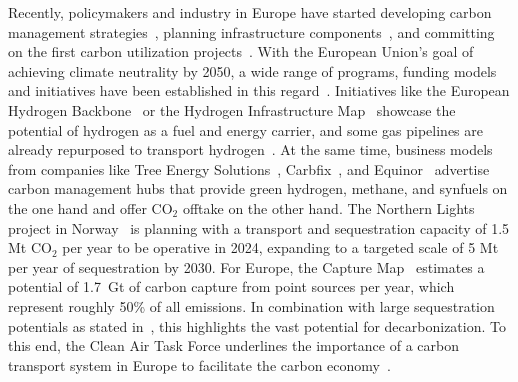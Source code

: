 \documentclass[twocolumn]{article}
\newcommand{\COtwo}{CO$_2$}
\begin{document}
Recently, policymakers and industry in Europe have started developing carbon management strategies~\cite{GermanyDevelopingStrategy2023,CarbonManagementStrategie}, planning infrastructure components~\cite{CONetz}, and committing on the first carbon utilization projects~\cite{EFuelsPilotPlant2022,OrstedAssumesFull,GROUNDBREAKINGEFUELPRODUCTION,DLREfuelsDLR}. With the European Union's goal of achieving climate neutrality by 2050, a wide range of programs, funding models and initiatives have been established in this regard~\cite{eu2023netzero,europeangreendeal,europeaninnovationfund}. Initiatives like the European Hydrogen Backbone~\cite{gasforclimateEuropeanHydrogenBackbone2022} or the Hydrogen Infrastructure Map~\cite{H2InfrastructureMap} showcase the potential of hydrogen as a fuel and energy carrier, and some gas pipelines are already repurposed to transport hydrogen~\cite{RohrFreiFuer}. At the same time, business models from companies like Tree Energy Solutions~\cite{TESHydrogenLife2023}, Carbfix~\cite{WeTurnCO2}, and Equinor~\cite{adomaitisEquinorRWEBuild2023} advertise carbon management hubs that provide green hydrogen, methane, and synfuels on the one hand and offer \COtwo{} offtake on the other hand. The Northern Lights project in Norway~\cite{NorthernLightsWhat} is planning with a transport and sequestration capacity of 1.5 Mt \COtwo{} per year  to be operative in 2024, expanding to a targeted scale of 5 Mt per year of sequestration by 2030.
For Europe, the Capture Map~\cite{ToolsGreenTransition} estimates a potential of 1.7~Gt of carbon capture from point sources per year, which represent roughly 50\% of all emissions. In combination with large sequestration potentials as stated in~\cite{weiProposedGlobalLayout2021}, this highlights the vast potential for decarbonization.
To this end, the Clean Air Task Force underlines the importance of a carbon transport system in Europe to facilitate the carbon economy~\cite{lockwoodEuropeanStrategyCarbon}.
\end{document}
